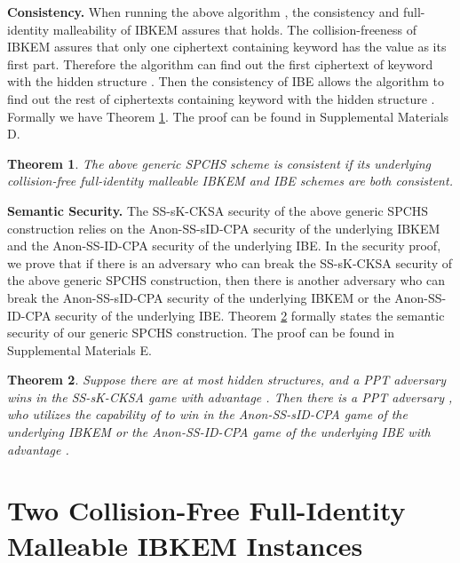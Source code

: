 \documentclass[10pt,twocolumn,twoside]{IEEEtran}
\newtheorem{theorem}{Theorem}
\begin{document}
{\textbf{Consistency.} When running the above algorithm , the consistency and full-identity malleability of IBKEM assures that  holds. The collision-freeness of IBKEM assures that only one ciphertext containing keyword  has the value  as its first part. Therefore the algorithm can find out the first ciphertext of keyword  with the hidden structure . Then the consistency of IBE allows the algorithm  to find out the rest of ciphertexts containing keyword  with the hidden structure . Formally we have Theorem \ref{T.SPCHS.Generic.Consistency}. The proof can be found in Supplemental Materials D.

\begin{theorem}\label{T.SPCHS.Generic.Consistency}
The above generic SPCHS scheme is consistent if its underlying collision-free full-identity malleable IBKEM and IBE schemes are both consistent.
\end{theorem}

\textbf{Semantic Security.} The SS-sK-CKSA security of the above generic SPCHS construction relies on the Anon-SS-sID-CPA security of the underlying IBKEM and the Anon-SS-ID-CPA security of the underlying IBE. In the security proof, we prove that if there is an adversary who can break the SS-sK-CKSA security of the above generic SPCHS construction, then there is another adversary who can break the Anon-SS-sID-CPA security of the underlying IBKEM or the Anon-SS-ID-CPA security of the underlying IBE. Theorem \ref{T.SPCHS.Generic.Security} formally states the semantic security of our generic SPCHS construction. The proof can be found in Supplemental Materials E.

\begin{theorem}\label{T.SPCHS.Generic.Security}
Suppose there are at most  hidden structures, and a PPT adversary  wins in the SS-sK-CKSA game with advantage . Then there is a PPT adversary , who utilizes the capability of  to win in the Anon-SS-sID-CPA game of the underlying IBKEM or the Anon-SS-ID-CPA game of the underlying IBE with advantage .
\end{theorem}

\section{Two Collision-Free Full-Identity Malleable IBKEM Instances}\label{S.IBKEM.Instances}

}
\end{document}
